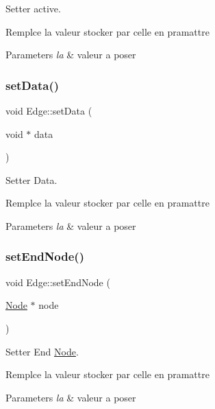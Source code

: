 Setter active. 

Remplce la valeur stocker par celle en pramattre


\begin{DoxyParams}{Parameters}
{\em la} & valeur a poser \\
\hline
\end{DoxyParams}
\mbox{\label{class_edge_a303fc7842a64e2ed4d583ea7cc273a51}} 
\subsubsection{\texorpdfstring{set\+Data()}{setData()}}
{\footnotesize\ttfamily void Edge\+::set\+Data (\begin{DoxyParamCaption}\item[{void $\ast$}]{data }\end{DoxyParamCaption})}



Setter Data. 

Remplce la valeur stocker par celle en pramattre


\begin{DoxyParams}{Parameters}
{\em la} & valeur a poser \\
\hline
\end{DoxyParams}
\mbox{\label{class_edge_a5d73c839006c47140491c76dcca2739e}} 
\subsubsection{\texorpdfstring{set\+End\+Node()}{setEndNode()}}
{\footnotesize\ttfamily void Edge\+::set\+End\+Node (\begin{DoxyParamCaption}\item[{\mbox{\hyperlink{class_node}{Node}} $\ast$}]{node }\end{DoxyParamCaption})}



Setter End \mbox{\hyperlink{class_node}{Node}}. 

Remplce la valeur stocker par celle en pramattre


\begin{DoxyParams}{Parameters}
{\em la} & valeur a poser \\
\hline
\end{DoxyParams}
\mbox{\label{class_edge_a33bc7cc18ba5f4bea6ba562722d70192}} 

